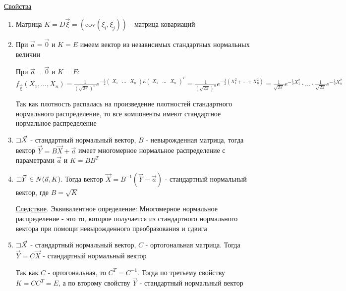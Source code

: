 \documentclass[12pt]{article}
\begin{document}
\begin{enumerate}
    \underline{Свойства}

    \begin{enumerate}
        \item Матрица $K = D \vec \xi = \left(\mathrm{cov} (\xi_i, \xi_j)\right)$ - матрица ковариаций

        \item При $\vec a = \vec 0$ и $K = E$ имеем вектор из независимых стандартных нормальных величин

        \begin{MyProof}
            При $\vec a = \vec 0$ и $K = E$: $f_{\vec \xi} (X_1, \dots, X_n) = \frac{1}{\left(\sqrt{2\pi}\right)^n} 
            e^{-\frac{1}{2} \begin{pmatrix}X_1 & \dots & X_n\end{pmatrix} E \begin{pmatrix}X_1 & \dots & X_n\end{pmatrix}^T} = 
            \frac{1}{\left(\sqrt{2\pi}\right)^n} e^{-\frac{1}{2} (X_1^2 + \dots + X_n^2)} = 
            \frac{1}{\sqrt{2\pi}} e^{-\frac{1}{2} X_1^2} \cdot \dots \cdot \frac{1}{\sqrt{2\pi}} e^{-\frac{1}{2} X_n^2}$

            Так как плотность распалась на произведение плотностей стандартного нормального распределение, то все компоненты имеют стандартное нормальное распределение
        \end{MyProof}

        \item $\mathord{\sqsupset} \vec X$ - стандартный нормальный вектор, $B$ - невырожденная матрица, 
        тогда вектор $\vec Y = B \vec X + \vec a$ имеет многомерное нормальное распределение с параметрами $\vec a$ и $K = B B^T$

        \item $\mathord{\sqsupset} \vec Y \in N(\vec a, K)$. Тогда вектор $\vec X = B^{-1} (\vec Y - \vec a)$ - стандартный нормальный вектор, где $B = \sqrt{K}$

        \underline{Следствие}. Эквивалентное определение: Многомерное нормальное распределение - это то, которое получается из
        стандартного нормального вектора при помощи невырожденного преобразования и сдвига

        \item $\mathord{\sqsupset} \vec X$ - стандартный нормальный вектор, $C$ - ортогональная матрица. Тогда $\vec Y = C \vec X$ - стандартный нормальный вектор

        \begin{MyProof}
            Так как $C$ - ортогональная, то $C^T = C^{-1}$. Тогда по третьему свойству $K = C C^T = E$, а по второму свойству $\vec Y$ - стандартный нормальный вектор
        \end{MyProof}


\end{enumerate}
\end{enumerate}
\end{document}
